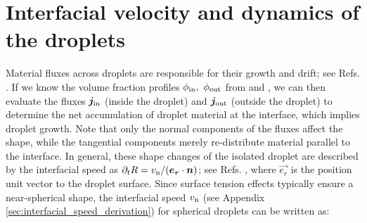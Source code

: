 \section{Interfacial velocity and dynamics of the droplets}

Material fluxes across droplets are responsible for their growth and drift; see Refs. \cite{Review2019,Weber2017}.
If we know the volume fraction profiles $\phi_\mathrm{in},~\phi_\mathrm{out}$ from  and , we can then evaluate the fluxes $\boldsymbol{j}_\mathrm{in}$ (inside the droplet) and $\boldsymbol{j}_\mathrm{out}$ (outside the droplet) to determine the net accumulation of droplet material at the interface, which implies droplet growth.
Note that only the normal components of the fluxes affect the shape, while the tangential components merely re-distribute material parallel to the interface.
In general, these shape changes of the isolated droplet are described by the interfacial speed as $\partial_t R = v_\mathrm{n} /  (\boldsymbol{e_r} \cdot \boldsymbol{n})$; see Refs. \cite{Review2019,Weber2017,Seyboldt_2018}, where $\vec{e_r}$ is the position unit vector to the droplet surface.
Since surface tension effects typically ensure a near-spherical shape, the interfacial speed $v_\mathrm{n}$ (see Appendix \ref{sec:interfacial_speed_derivation}) for spherical droplets can be written as:

